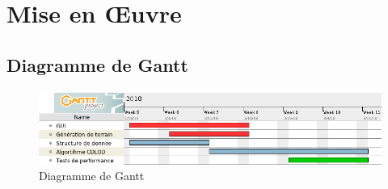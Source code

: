 \documentclass[12pt]{report}
\begin{document}
\newpage

\chapter*{Mise en Œuvre}
\setcounter{chapter}{4}




\section{Diagramme de Gantt}

\begin{figure}[!h]
  \includegraphics[scale=0.5]{img/gantt.png}
  \caption{Diagramme de Gantt}
  \label{fig:gantt}
\end{figure}

{}

\end{document}
